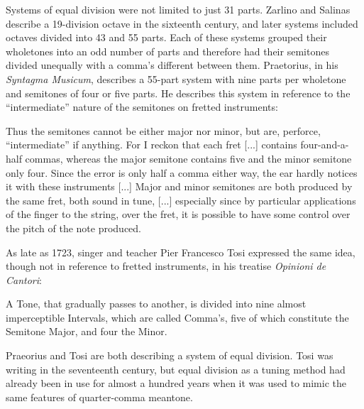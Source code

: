 Systems of equal division were not limited to just 31 parts.  Zarlino and Salinas
describe a 19-division octave in the sixteenth century, and later systems included
octaves divided into 43 and 55 parts.  Each of these systems grouped their wholetones
into an odd number of parts and therefore had their semitones divided unequally with a
comma's different between them. Praetorius, in his \textit{Syntagma Musicum}, describes
a 55-part system with nine parts per wholetone and semitones of four or five parts.  He
describes this system in reference to the ``intermediate'' nature of the semitones on
fretted instruments:
\begin{blocks}
Thus the semitones cannot be either major nor minor, but are, perforce, ``intermediate''
if anything. For I reckon that each fret [...] contains four-and-a-half commas, whereas
the major semitone contains five and the minor semitone only four. Since the error is
only half a comma either way, the ear hardly notices it with these instruments [...]
Major and minor semitones are both produced by the same fret, both sound in tune, [...]
especially since by particular applications of the finger to the string, over the fret,
it is possible to have some control over the pitch of the note produced.
\autocite[68]{MP:1}
\end{blocks}
As late as 1723, singer and teacher Pier Francesco Tosi expressed the same idea, though
not in reference to fretted instruments, in his treatise \textit{Opinioni de Cantori}:
\begin{blocks}
A Tone, that gradually passes to another, is divided into nine almost imperceptible
Intervals, which are called Comma's, five of which constitute the Semitone Major, and four
the Minor.
\autocite[20]{PFT:1}
\end{blocks}
Praeorius and Tosi are both describing a system of equal division.  Tosi was writing in
the seventeenth century, but equal division as a tuning method had already been in use for
almost a hundred years when it was used to mimic the same features of quarter-comma
meantone.

